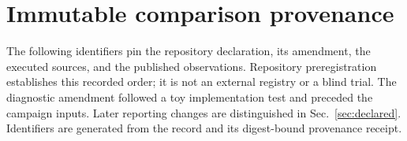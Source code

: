 \documentclass[aps,pra,reprint,superscriptaddress,nofootinbib,floatfix,
  showkeys,raggedbottom]{revtex4-2}
\begin{document}
\section{Immutable comparison provenance}
\label{app:provenance}

The following identifiers pin the repository declaration, its amendment, the
executed sources, and the published observations. Repository preregistration
establishes this recorded order; it is not an external registry or a blind
trial. The diagnostic amendment followed a toy implementation test and
preceded the campaign inputs. Later reporting changes are distinguished in
Sec.~\ref{sec:declared}. Identifiers are generated from the record and its
digest-bound provenance receipt.

\begin{quote}

\end{quote}



\end{document}
